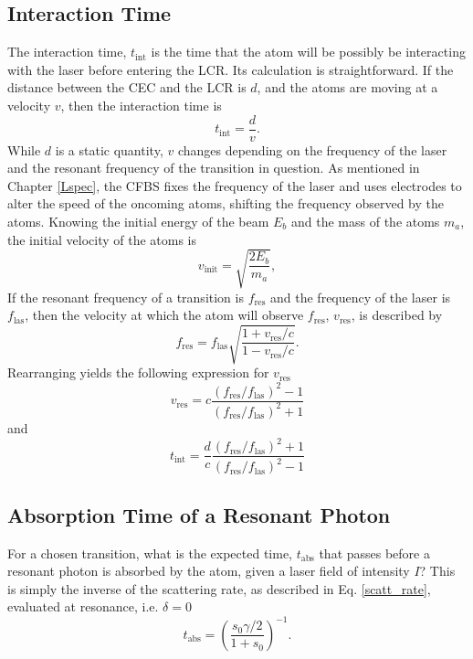 \subsection{Interaction Time}
The interaction time, $t_{\mathrm{int}}$ is the time that the atom will be possibly be interacting with the laser before entering the LCR. Its calculation is straightforward. If the distance between the CEC and the LCR is $d$, and the atoms are moving at a velocity $v$, then the interaction time is
\begin{equation}
t_{\mathrm{int}} = \frac{d}{v}.
\end{equation}
While $d$ is a static quantity, $v$ changes depending on the frequency of the laser and the resonant frequency of the transition in question. As mentioned in Chapter \ref{Lspec}, the CFBS fixes the frequency of the laser and uses electrodes to alter the speed of the oncoming atoms, shifting the frequency observed by the atoms. Knowing the initial energy of the beam $E_b$ and the mass of the atoms $m_a$, the initial velocity of the atoms is 
\begin{equation}
v_{\mathrm{init}}=\sqrt{\frac{2E_b}{m_a}},
\end{equation}
If the resonant frequency of a transition is $f_{\mathrm{res}}$ and the frequency of the laser is $f_{\mathrm{las}}$, then the velocity at which the atom will observe $f_{\mathrm{res}}$, $v_{\mathrm{res}}$, is described by \cite{cmec}
\begin{equation}
f_{\mathrm{res}} = f_{\mathrm{las}} \sqrt{\frac{1+v_{\mathrm{res}}/c}{1-v_{\mathrm{res}}/c}}.
\end{equation}
Rearranging yields the following expression for $v_{\mathrm{res}}$
\begin{equation}
v_{\mathrm{res}} = c \frac{(f_{\mathrm{res}}/f_{\mathrm{las}})^2-1}{(f_{\mathrm{res}}/f_{\mathrm{las}})^2+1}
\end{equation}
and
\begin{equation}
t_{\mathrm{int}} = \frac{d}{c} \frac{(f_{\mathrm{res}}/f_{\mathrm{las}})^2+1}{(f_{\mathrm{res}}/f_{\mathrm{las}})^2-1}
\end{equation}

\subsection{Absorption Time of a Resonant Photon}
For a chosen transition, what is the expected time, $t_{\mathrm{abs}}$ that passes before a resonant photon is absorbed by the atom, given a laser field of intensity $I$? This is simply the inverse of the scattering rate, as described in Eq. \ref{scatt_rate}, evaluated at resonance, i.e. $\delta = 0$
\begin{equation}
t_{\mathrm{abs}} = \left(\frac{s_0\gamma/2}{1+s_0}\right)^{-1}.
\end{equation}

